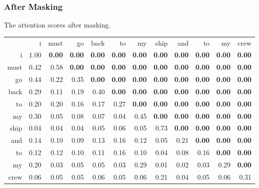 \begin{frame}[fragile]
\frametitle{After Masking}\color{structure}
The attention scores after masking.
\begin{scriptsize}
\begin{tabular}{rrrrrrrrrrrr}
&i&must&go&back&to&my&ship&and&to&my&crew\\
i&1.00& \textbf{0.00}& \textbf{0.00}& \textbf{0.00}& \textbf{0.00}& \textbf{0.00}& \textbf{0.00}& \textbf{0.00}& \textbf{0.00}&  \textbf{0.00}& \textbf{0.00} \\
  must      &0.42& 0.58& \textbf{0.00}& \textbf{0.00}& \textbf{0.00}& \textbf{0.00}& \textbf{0.00}& \textbf{0.00}& \textbf{0.00}&         \textbf{0.00}& \textbf{0.00} \\
  go      &0.44& 0.22& 0.35& \textbf{0.00}& \textbf{0.00}& \textbf{0.00}& \textbf{0.00}& \textbf{0.00}& \textbf{0.00}&         \textbf{0.00}& \textbf{0.00} \\
 back       &0.29& 0.11& 0.19& 0.40& \textbf{0.00}& \textbf{0.00}& \textbf{0.00}& \textbf{0.00}& \textbf{0.00}&         \textbf{0.00}& \textbf{0.00} \\
  to      &0.20& 0.20& 0.16& 0.17& 0.27& \textbf{0.00}& \textbf{0.00}& \textbf{0.00}& \textbf{0.00}&         \textbf{0.00}& \textbf{0.00} \\
 my       &0.30& 0.05& 0.08& 0.07& 0.04& 0.45& \textbf{0.00}& \textbf{0.00}& \textbf{0.00}&         \textbf{0.00}& \textbf{0.00} \\
ship        &0.04& 0.04& 0.04& 0.05& 0.06& 0.05& 0.73& \textbf{0.00}& \textbf{0.00}&         \textbf{0.00}& \textbf{0.00} \\
and        &0.14& 0.10& 0.09& 0.13& 0.16& 0.12& 0.05& 0.21& \textbf{0.00}&         \textbf{0.00}& \textbf{0.00} \\
to        &0.12& 0.12& 0.10& 0.11& 0.16& 0.10& 0.04& 0.08& 0.16&         \textbf{0.00}& \textbf{0.00} \\
my        &0.20& 0.03& 0.05& 0.05& 0.03& 0.29& 0.01& 0.02& 0.03&         0.29& \textbf{0.00} \\
 crew       &0.06& 0.05& 0.05& 0.06& 0.05& 0.06& 0.21& 0.04& 0.05&         0.06& 0.31\\
         \end{tabular}
\end{scriptsize}
\end{frame}

